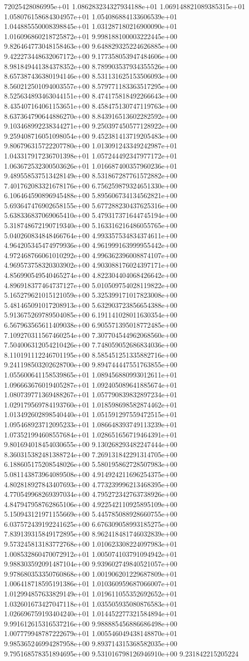 72025428086995e+01	1.086283234327934188e+01	1.069148821089385315e+01	1.058076158684304957e+01	1.054086884133606539e+01	1.044885550008398845e+01	1.031287180216900090e+01	1.016096860218725872e+01	9.998188100003222445e+00	9.826464773048158463e+00	9.648829325224626885e+00	9.422273448632067172e+00	9.177358053947484606e+00	8.981849441384378352e+00	8.789903537934355526e+00	8.657387436380194146e+00	8.531131625153506093e+00	8.560212501094003557e+00	8.579771183363517295e+00	8.525634893463044151e+00	8.474175818492266643e+00	8.435407164061153651e+00	8.458475130747119763e+00	8.637364790644886270e+00	8.843916513602282592e+00	9.103468992238344271e+00	9.250397450577128922e+00	9.259408716051098054e+00	9.452381413719205483e+00	9.806796315722207780e+00	1.013091243349242987e+01	1.043317917236701398e+01	1.057244492347977172e+01	1.063672532300503626e+01	1.016687400357960236e+01	9.489558537513428149e+00	8.531867287761572882e+00	7.401762083321678176e+00	6.756259879324651330e+00	6.106464590896945488e+00	5.895606734134562821e+00	5.693647476902658155e+00	5.677288230437625316e+00	5.638336837069065410e+00	5.479317371644745194e+00	5.318748672190719340e+00	5.163316216486055765e+00	5.040260834848466764e+00	4.993357534834374611e+00	4.964205345474979936e+00	4.961999163999955442e+00	4.972468766061010292e+00	4.996362396008874107e+00	4.969573758320303902e+00	4.903088176024397171e+00	4.856990549540465274e+00	4.822304404068426642e+00	4.896918377464737127e+00	5.010509754028119822e+00	5.165279621015121059e+00	5.325399171017823008e+00	5.481465091017208913e+00	5.632903723856654388e+00	5.913675269789504085e+00	6.191141028011630354e+00	6.567963565611409038e+00	6.905571395018772485e+00	7.109270311567460254e+00	7.307704544962068560e+00	7.504006312054210426e+00	7.748059052686834036e+00	8.110191112246701195e+00	8.585451251335882716e+00	9.241198503202628700e+00	9.894744447551763855e+00	1.055600641158539865e+01	1.089456880993012611e+01	1.096663676019405287e+01	1.092405089641885674e+01	1.080739771369488267e+01	1.057790839832897234e+01	1.029179569784193760e+01	1.018598698582874462e+01	1.013492602898540440e+01	1.051591297559472515e+01	1.095468923712095233e+01	1.086648393749113239e+01	1.073521994608557684e+01	1.028651656719464391e+01	9.801694018454030655e+00	9.130268293482247444e+00	8.360315382481388724e+00	7.269131842291314705e+00	6.188605175208548026e+00	5.580195862728507983e+00	5.081143873964089508e+00	4.914924211696254375e+00	4.802818927843407693e+00	4.773239996213468395e+00	4.770549968269397034e+00	4.795272342763738926e+00	4.847947958762865106e+00	4.922542110925895109e+00	5.150943121971155669e+00	5.445785088928660755e+00	6.037572439192241625e+00	6.676309058993185275e+00	7.839139315849172895e+00	8.962418481746032839e+00	9.573245813183772768e+00	1.010623308224097983e+01	1.008532860470072912e+01	1.005074103791094942e+01	9.988303592091487104e+00	9.939602749840521057e+00	9.978680353350760868e+00	1.001906201229687809e+01	1.006418718595191386e+01	1.010360959687066007e+01	1.012994857633829149e+01	1.019611055352692652e+01	1.032601673427047118e+01	1.035505935080876583e+01	1.026696759193404240e+01	1.014452277321584894e+01	9.991612615316537216e+00	9.988885456886686498e+00	1.007779948787222679e+01	1.005546049438148870e+01	9.985365246994287958e+00	9.893714315368582035e+00	9.795168578351894695e+00	9.531016798126946910e+00	9.231842215205224